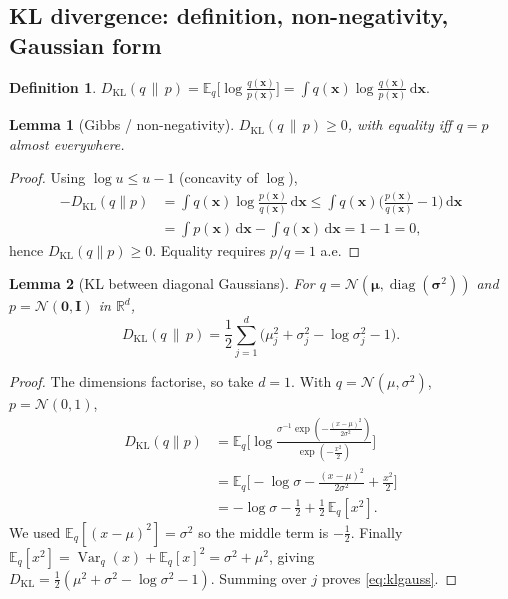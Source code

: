 \documentclass[12pt,a4paper]{article}
\theoremstyle{definition}
\newtheorem{definition}{Definition}
\theoremstyle{plain}
\newtheorem{lemma}{Lemma}
\newcommand{\R}{\mathbb{R}}
\newcommand{\E}{\mathbb{E}}
\newcommand{\N}{\mathcal{N}}
\newcommand{\KL}{D_{\mathrm{KL}}}
\newcommand{\x}{\bm{x}}
\newcommand{\II}{\mathbf{I}}
\newcommand{\dd}{\,\mathrm{d}}
\DeclareMathOperator{\Var}{Var}
\DeclareMathOperator{\diag}{diag}
\begin{document}
\subsection{KL divergence: definition, non-negativity, Gaussian form}
\begin{definition}
$\KL(q\,\|\,p)=\E_{q}\!\big[\log\frac{q(\x)}{p(\x)}\big]=\int q(\x)\log\frac{q(\x)}{p(\x)}\dd\x.$
\end{definition}
\begin{lemma}[Gibbs / non-negativity]\label{lem:gibbs}
$\KL(q\,\|\,p)\ge 0$, with equality iff $q=p$ almost everywhere.
\end{lemma}
\begin{proof}
Using $\log u \le u-1$ (concavity of $\log$),
\begin{align}
-\KL(q\|p)&=\int q(\x)\log\frac{p(\x)}{q(\x)}\dd\x
\le \int q(\x)\Big(\frac{p(\x)}{q(\x)}-1\Big)\dd\x\\
&=\int p(\x)\dd\x-\int q(\x)\dd\x = 1-1 = 0,
\end{align}
hence $\KL(q\|p)\ge0$. Equality requires $p/q=1$ a.e.
\end{proof}

\begin{lemma}[KL between diagonal Gaussians]\label{lem:klgauss}
For $q=\N(\bm\mu,\diag(\bm\sigma^2))$ and $p=\N(\bm0,\II)$ in $\R^d$,
\begin{equation}
\KL(q\,\|\,p)=\frac12\sum_{j=1}^{d}
\Big(\mu_j^2+\sigma_j^2-\log\sigma_j^2-1\Big).
\label{eq:klgauss}
\end{equation}
\end{lemma}
\begin{proof}
The dimensions factorise, so take $d=1$. With
$q=\N(\mu,\sigma^2)$, $p=\N(0,1)$,
\begin{align}
\KL(q\|p)&=\E_q\!\Big[\log\frac{\sigma^{-1}\exp(-\tfrac{(x-\mu)^2}{2\sigma^2})}
{\exp(-\tfrac{x^2}{2})}\Big]\\
&=\E_q\!\Big[-\log\sigma-\tfrac{(x-\mu)^2}{2\sigma^2}+\tfrac{x^2}{2}\Big]\\
&=-\log\sigma-\tfrac12+\tfrac12\,\E_q[x^2].
\end{align}
We used $\E_q[(x-\mu)^2]=\sigma^2$ so the middle term is $-\tfrac12$. Finally
$\E_q[x^2]=\Var_q(x)+\E_q[x]^2=\sigma^2+\mu^2$, giving
$\KL=\tfrac12(\mu^2+\sigma^2-\log\sigma^2-1)$. Summing over $j$ proves
\eqref{eq:klgauss}.
\end{proof}
\end{document}
